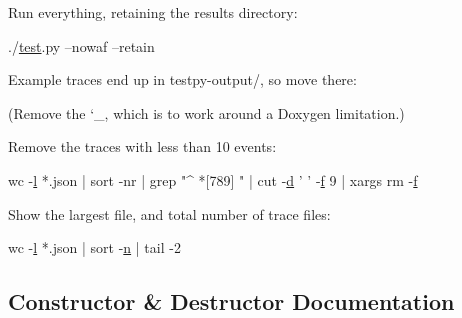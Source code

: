 \begin{DoxyItemize}
\item Run everything, retaining the results directory\+: ~\newline
 
\begin{DoxyCode}
./\hyperlink{main-test-sync_8cc_a708a4c1a4d0c4acc4c447310dd4db27f}{test}.py --nowaf --retain 
\end{DoxyCode}
 \item Example traces end up in {\ttfamily testpy-\/output/}, so move there\+: ~\newline
 
 (Remove the `\+\_\+\textquotesingle{}, which is to work around a Doxygen limitation.) \item Remove the traces with less than 10 events\+: ~\newline
 
\begin{DoxyCode}
wc -\hyperlink{buildings__pathloss_8m_a5b54c0a045f179bcbbbc9abcb8b5cd4c}{l} *.json | sort -nr | grep \textcolor{stringliteral}{"^ *[789] "} | cut -\hyperlink{buildings__pathloss_8m_a9f9b934daed17a4d3613b6886ff4cf4b}{d} \textcolor{charliteral}{' '} -\hyperlink{buildings__pathloss_8m_aa52d3a6e3de5a80a97c12364caeaa125}{f} 9 | xargs rm -\hyperlink{buildings__pathloss_8m_aa52d3a6e3de5a80a97c12364caeaa125}{f} 
\end{DoxyCode}
 \item Show the largest file, and total number of trace files\+: ~\newline
 
\begin{DoxyCode}
wc -\hyperlink{buildings__pathloss_8m_a5b54c0a045f179bcbbbc9abcb8b5cd4c}{l} *.json | sort -\hyperlink{namespacesample-rng-plot_aeb5ee5c431e338ef39b7ac5431242e1d}{n} | tail -2 
\end{DoxyCode}
 \end{DoxyItemize}


\subsection{Constructor \& Destructor Documentation}
